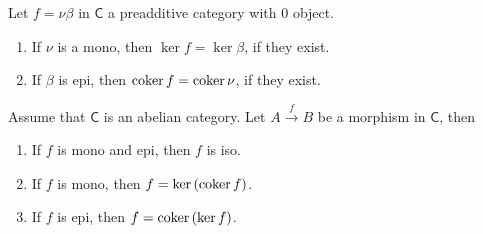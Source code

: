 \begin{lem}
	Let $f = \nu \beta$ in $\mathsf{C}$ a preadditive category with $0$ object.
	\begin{enumerate}
		\item If $\nu$ is a mono, then $\ker f = \ker \beta$, if they exist.
		\item If $\beta$ is epi, then $\operatorname{coker} f = \operatorname{coker} \nu$, if they exist.
	\end{enumerate}
\end{lem} 

\begin{lem}
	Assume that $\mathsf{C}$ is an abelian category.
	Let $A \xrightarrow{f} B$ be a morphism in $\mathsf{C}$, then
	\begin{enumerate}
		\item If $f$ is mono and epi, then $f$ is iso.
		\item If $f$ is mono, then $f = \ker \left( \operatorname{coker} f \right)$.
		\item If $f$ is epi, then $f = \operatorname{coker} \left( \ker f \right)$.
	\end{enumerate}
\end{lem} 


